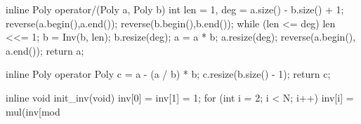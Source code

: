 \begin{Cpp}
{inline Poly operator/(Poly a, Poly b) {
  int len = 1, deg = a.size() - b.size() + 1;
  reverse(a.begin(),a.end());
  reverse(b.begin(),b.end());
  while (len <= deg) len <<= 1;
  b = Inv(b, len); b.resize(deg);
  a = a * b; a.resize(deg);
  reverse(a.begin(), a.end());
  return a;
}

inline Poly operator%
  Poly c = a - (a / b) * b;
  c.resize(b.size() - 1);
  return c;
}

inline void init_inv(void) {
  inv[0] = inv[1] = 1;
  for (int i = 2; i < N; i++) inv[i] = mul(inv[mod %
}
\end{Cpp}
